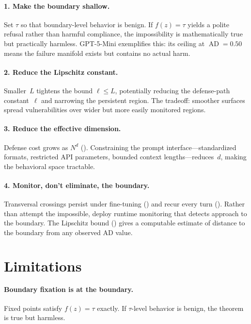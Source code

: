 \documentclass{article}
\newcommand{\AD}{\operatorname{AD}}
\begin{document}
\paragraph{1. Make the boundary shallow.}
Set $\tau$ so that boundary-level behavior is benign. If $f(z) = \tau$
yields a polite refusal rather than harmful compliance, the
impossibility is mathematically true but practically harmless.
GPT-5-Mini exemplifies this: its ceiling at $\AD = 0.50$ means the
failure manifold exists but contains no actual harm.

\paragraph{2. Reduce the Lipschitz constant.}
Smaller~$L$ tightens the bound $\ell \leq L$, potentially reducing
the defense-path constant~$\ell$ and narrowing the persistent region.
The tradeoff: smoother surfaces spread vulnerabilities over wider but
more easily monitored regions.

\paragraph{3. Reduce the effective dimension.}
Defense cost grows as $N^d$ (). Constraining the prompt
interface---standardized formats, restricted API parameters, bounded
context lengths---reduces~$d$, making the behavioral space tractable.

\paragraph{4. Monitor, don't eliminate, the boundary.}
Transversal crossings persist under fine-tuning ()
and recur every turn (). Rather than attempt the
impossible, deploy runtime monitoring that detects approach to the
boundary. The Lipschitz bound () gives a
computable estimate of distance to the boundary from any observed AD
value.

\section{Limitations}
\label{sec:limitations}

\paragraph{Boundary fixation is at the boundary.}
Fixed points satisfy $f(z) = \tau$ exactly. If $\tau$-level behavior
is benign, the theorem is true but harmless.
\end{document}
